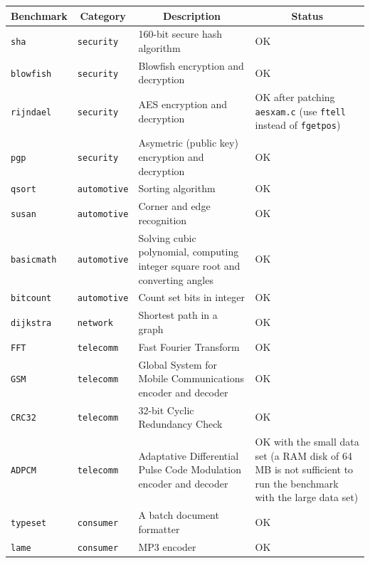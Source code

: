 \begin{table}[p]
	\begin{center}
		\begin{tabular}{|l|l|p{5cm}|p{5cm}|}
		\hline
		\multicolumn{1}{|c|}{\textbf{Benchmark}} & \multicolumn{1}{|c|}{\textbf{Category}} & \multicolumn{1}{|c|}{\textbf{Description}} & \multicolumn{1}{|c|}{\textbf{Status}}\\
		\hline
		\texttt{sha} & \texttt{security} & 160-bit secure hash algorithm & OK \\
		\hline
		\texttt{blowfish} & \texttt{security} & Blowfish encryption and decryption & OK \\
		\hline
		\texttt{rijndael} & \texttt{security} & AES encryption and decryption & OK after patching \texttt{aesxam.c} (use \texttt{ftell} instead of \texttt{fgetpos})\\
		\hline
		\texttt{pgp} & \texttt{security} & Asymetric (public key) encryption and decryption & OK \\
		\hline
		\texttt{qsort} & \texttt{automotive} & Sorting algorithm & OK \\
		\hline
		\texttt{susan} & \texttt{automotive} & Corner and edge recognition & OK \\
		\hline
		\texttt{basicmath} & \texttt{automotive} & Solving cubic polynomial, computing integer square root and converting angles & OK \\
		\hline
		\texttt{bitcount} & \texttt{automotive} & Count set bits in integer & OK \\
		\hline
		\texttt{dijkstra} & \texttt{network} & Shortest path in a graph & OK \\
		\hline
		\texttt{FFT} & \texttt{telecomm} & Fast Fourier Transform & OK \\
		\hline
		\texttt{GSM} & \texttt{telecomm} & Global System for Mobile Communications encoder and decoder & OK \\
		\hline
		\texttt{CRC32} & \texttt{telecomm} & 32-bit Cyclic Redundancy Check & OK \\
		\hline
		\texttt{ADPCM} & \texttt{telecomm} & Adaptative Differential Pulse Code Modulation encoder and decoder & OK with the small data set (a RAM disk of 64 MB is not sufficient to run the benchmark with the large data set) \\
		\hline
		\texttt{typeset} & \texttt{consumer} & A batch document formatter & OK \\
		\hline
		\texttt{lame} & \texttt{consumer} & MP3 encoder & OK \\
		\hline

\end{tabular}
\end{center}
\end{table}
